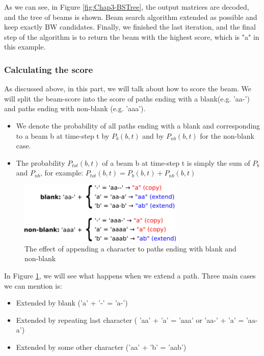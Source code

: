 As we can see, in Figure \ref{fig:Chap3-BSTree}, the output matrices are decoded, and the tree of beams is shown. Beam search algorithm extended as possible and keep exactly BW candidates. Finally, we finished the last iteration, and the final step of the algorithm is to return the beam with the highest score, which is "a" in this example.

\subsubsection{Calculating the score}

As discussed above, in this part, we will talk about how to score the beam. We will split the beam-score into the score of paths ending with a blank(e.g. 'aa-') and paths ending with non-blank (e.g. 'aaa').

\begin{itemize}
	\item We denote the probability of all paths ending with a blank and corresponding to a beam b at time-step t
	      by $ P_{b}(b,t) $ and by $ P_{nb}(b,t) $ for the non-blank case.
	\item The probability $P_{tot}(b,t)$ of a beam b at time-step t is simply the sum of $P_b$ and $P_{nb}$, for example:
	      $P_{tot}(b,t) = P_b(b,t) + P_{nb}(b,t)$
\end{itemize}

\begin{figure}[H]
	\centering
	\includegraphics[width=0.7\textwidth]{img/Chap3/CTC_Scoring}
	\caption{ The effect of appending a character to paths ending with blank and non-blank }
	\label{fig:Chap3-CTC_Scoring}
\end{figure}

In Figure \ref{fig:Chap3-CTC_Scoring}, we will see what happens when we extend a path. Three main cases we can mention
is:
\begin{itemize}
	\item Extended by blank ('a' + '-' = 'a-')
	\item Extended by repeating last character ( 'aa' + 'a' = 'aaa' or 'aa-' + 'a' = 'aa-a')
	\item Extended by some other character ('aa' + 'b' = 'aab')
\end{itemize}

